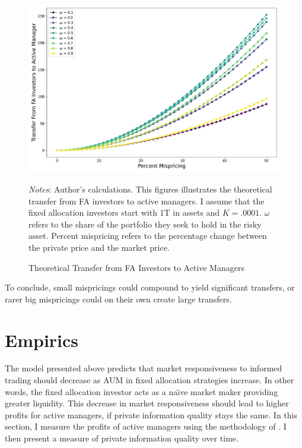 \documentclass[12pt]{article}
\begin{document}
\begin{figure}[H]{}
    \centering
    \caption{Theoretical Transfer from FA Investors to Active Managers}
    \includegraphics[width=\textwidth]{figures/profit_vs_mispricing_different_omegas.pdf}
    \begin{spacing}{1}
{\parbox{.95\linewidth}{
		\scriptsize{\scriptsize{{\emph{Notes}: Author's calculations. This figures illustrates the theoretical transfer from FA investors to active managers. I assume that the fixed allocation investors start with 1T in assets and $K=.0001$. $\omega$ refers to the share of the portfolio they seek to hold in the risky asset. Percent mispricing refers to the percentage change between the private price and the market price.  }}}}}
\end{spacing}
    \label{fig:profit_mispricing}
\end{figure} To conclude, small mispricings could compound to yield significant transfers, or rarer big mispricings could on their own create large transfers.

\section{Empirics} \label{sec:empirics}
The model presented above predicts that market responsiveness to informed trading should decrease as AUM in fixed allocation strategies increase. In other words, the fixed allocation investor acts as a na\"{\i}ve market maker providing greater liquidity. This decrease in market responsiveness should lead to higher profits for active managers, if private information quality stays the same. In this section, I measure the profits of active managers using the methodology of \citet{BERK2015}. I then present a measure of private information quality over time. 
\end{document}
